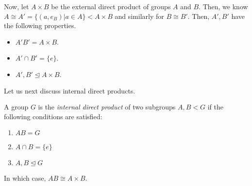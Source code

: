 \documentclass[11pt,leqno,oneside]{amsart}
\newcommand{\subgroup}{\mathrel{<}}
\newcommand{\normsubgroup}{\mathrel{\unlhd}}
\newcommand{\isom}{\mathrel{\cong}}
\begin{document}
Now, let $A \times B$ be the external direct product of groups $A$ and $B$.
Then, we know $A \isom A' = \{(a,e_B) | a \in A\} \subgroup A \times B$ and
similarly for $B \isom B'$. Then, $A',B'$ have the following properties.
\begin{itemize}
    \item $A'B' = A \times B$.
    \item $A' \cap B' = \{e\}$.
    \item $A', B' \normsubgroup A \times B$.
\end{itemize}

Let us next discuss internal direct products.

\begin{defn}
    A group $G$ is the \emph{internal direct product} of two subgroups $A,B
    \subgroup G$ if the following conditions are satisfied:
    \begin{enumerate}[label=\roman*)]
        \item $AB = G$
        \item $A \cap B = \{e\}$
        \item $A,B \normsubgroup G$
    \end{enumerate}
\end{defn}
\begin{rmk*}
    In which case, $AB \isom A \times B$.
\end{rmk*}
\end{document}
